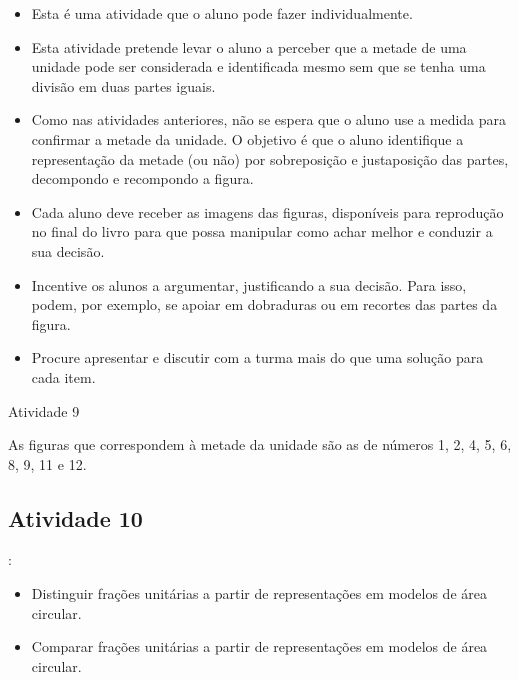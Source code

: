 \begin{multicols}{2}
  \begin{itemize} %
    \item       Esta é uma atividade que o aluno pode fazer individualmente.
    \item       Esta atividade pretende levar o aluno a perceber que a metade de uma unidade pode ser considerada e identificada mesmo sem que se tenha uma divisão em duas partes iguais.
    \item       Como nas atividades anteriores, não se espera que o aluno use a medida para confirmar a metade da unidade. O objetivo é que o aluno identifique a representação da metade (ou não) por sobreposição e justaposição das partes, decompondo e recompondo a figura.
    \item       Cada aluno deve receber as imagens das figuras, disponíveis para reprodução no final do livro para que possa manipular como achar melhor e conduzir a sua decisão.
    \item       Incentive os alunos a argumentar, justificando a sua decisão. Para isso, podem, por exemplo, se apoiar em dobraduras ou em recortes das partes da figura.
    \item       Procure apresentar e discutir com a turma mais do que uma solução para cada item.
\end{itemize} %

\begin{resposta*}{Atividade 9}

  As figuras que correspondem à metade da unidade são as de números 1, 2, 4, 5, 6, 8, 9, 11 e 12.
\end{resposta*}

\subsection{Atividade 10}

:
\begin{itemize}
 \item Distinguir frações unitárias a partir de representações em modelos de área circular.
\item     Comparar frações unitárias a partir de representações em modelos de área circular.
\end{itemize}

 \vspace{.1cm}

 \vspace{.1cm}


\end{multicols}
